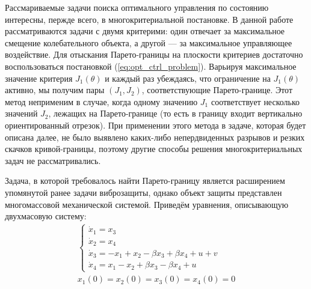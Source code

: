 Рассмариваемые задачи поиска оптимального управления по состоянию интересны, пержде
всего, в многокритериальной постановке. В данной работе рассматриваются
задачи с двумя критерими: один отвечает за максимальное смещение колебательного объекта,
а другой --- за максимальное управляющее воздействие. Для отыскания Парето-границы на
плоскости критериев достаточно воспользоваться постановкой (\ref{eq:opt_ctrl_problem}).
Варьируя максимальное значение критерия \(J_1(\theta)\) и каждый раз убеждаясь, что
ограничение на \(J_1(\theta)\) активно, мы получим пары \((J_1,J_2)\), соответствующие
Парето-границе. Этот метод неприменим в случае, когда одному значению \(J_1\)
соответствует несколько значений \(J_2\), лежащих на Парето-границе (то есть в
границу входит вертикально ориентированный отрезок). При применении этого метода в задаче,
которая будет описана далее, не было выявлено каких-либо непердвиденных разрывов и резких скачков кривой-границы,
поэтому другие способы решения многокритериальных задач не рассматривались.

Задача, в которой требовалось найти Парето-границу является расширением упомянутой ранее
задачи виброзащиты, однако объект защиты представлен многомассовой механической системой.
Приведём уравнения, описывающую двухмасовую систему:
\begin{displaymath}
  \begin{array}{cr}
    \begin{cases}
      \dot x_1 = x_3 \\
      \dot x_2 = x_4 \\
      \dot x_3 = -x_1 + x_2 - \beta x_3 + \beta x_4 + u + v \\
      \dot x_4 = x_1 - x_2 + \beta x_3 - \beta x_4 + u
    \end{cases} \\
    x_1(0)=x_2(0)=x_3(0)=x_4(0)=0
\end{array}
\end{displaymath}

